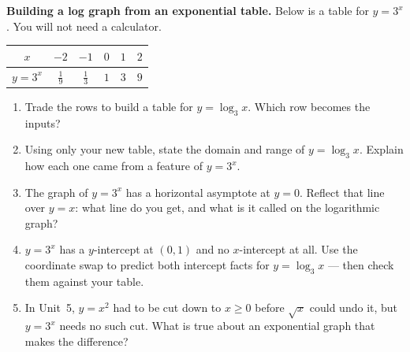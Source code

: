 \documentclass[10pt]{article}
\begin{document}
\begin{extensionbox}
\textbf{Building a log graph from an exponential table.} Below is a table for $y=3^x$. You will not
need a calculator.
\begin{center}
\renewcommand{\arraystretch}{1.25}
\begin{tabular}{|c|c|c|c|c|c|}
\hline
$x$ & $-2$ & $-1$ & $0$ & $1$ & $2$ \\ \hline
$y=3^x$ & $\tfrac19$ & $\tfrac13$ & $1$ & $3$ & $9$ \\ \hline
\end{tabular}
\end{center}
\begin{enumerate}[label=(\alph*), leftmargin=1.8em, itemsep=5pt]
  \item Trade the rows to build a table for $y=\log_3 x$. Which row becomes the inputs?
  \item Using only your new table, state the domain and range of $y=\log_3 x$. Explain how each one
        came from a feature of $y=3^x$.
  \item The graph of $y=3^x$ has a horizontal asymptote at $y=0$. Reflect that line over $y=x$: what
        line do you get, and what is it called on the logarithmic graph?
  \item $y=3^x$ has a $y$-intercept at $(0,1)$ and no $x$-intercept at all. Use the coordinate swap
        to predict both intercept facts for $y=\log_3 x$ --- then check them against your table.
  \item In Unit~5, $y=x^2$ had to be cut down to $x\ge 0$ before $\sqrt{x}$ could undo it, but
        $y=3^x$ needs no such cut. What is true about an exponential graph that makes the difference?
\end{enumerate}
\end{extensionbox}
\end{document}
